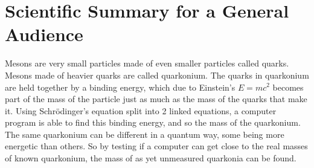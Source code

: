 \documentclass[10pt,twocolumn]{revtex4}    %
\begin{document}
\clearpage

\onecolumngrid %

\section*{Scientific Summary for a General Audience}
\newline
\newline
Mesons are very small particles made of even smaller particles called quarks. Mesons made of heavier quarks are called quarkonium. The quarks in quarkonium are held together by a binding energy, which due to Einstein's $E=mc^2$ becomes part of the mass of the particle just as much as the mass of the quarks that make it.  Using Schr\"odinger's equation split into 2 linked equations, a computer program is able to find this binding energy, and so the mass of the quarkonium. The same quarkonium can be different in a quantum way, some being more energetic than others. So by testing if a computer can get close to the real masses of known quarkonium, the mass of as yet unmeasured quarkonia can be found. 
\end{document}
